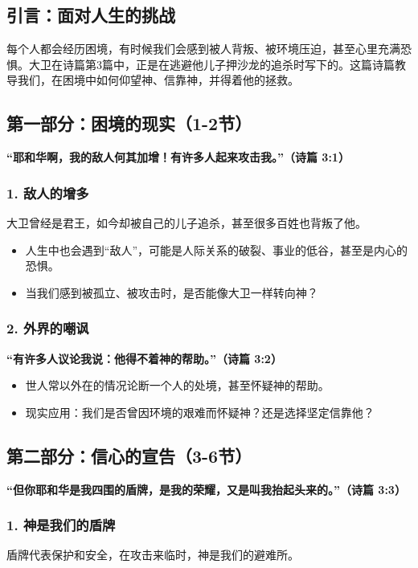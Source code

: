 \documentclass[a4paper, 12pt]{article}
\begin{document}
\subsection*{引言：面对人生的挑战}

每个人都会经历困境，有时候我们会感到被人背叛、被环境压迫，甚至心里充满恐惧。大卫在诗篇第3篇中，正是在逃避他儿子押沙龙的追杀时写下的。这篇诗篇教导我们，在困境中如何仰望神、信靠神，并得着他的拯救。

\subsection*{第一部分：困境的现实（1-2节）}

\textbf{“耶和华啊，我的敌人何其加增！有许多人起来攻击我。”（诗篇 3:1）}

\subsubsection*{1. 敌人的增多}
大卫曾经是君王，如今却被自己的儿子追杀，甚至很多百姓也背叛了他。
\begin{itemize}
    \item 人生中也会遇到“敌人”，可能是人际关系的破裂、事业的低谷，甚至是内心的恐惧。
    \item 当我们感到被孤立、被攻击时，是否能像大卫一样转向神？
\end{itemize}

\subsubsection*{2. 外界的嘲讽}
\textbf{“有许多人议论我说：他得不着神的帮助。”（诗篇 3:2）}

\begin{itemize}
    \item 世人常以外在的情况论断一个人的处境，甚至怀疑神的帮助。
    \item 现实应用：我们是否曾因环境的艰难而怀疑神？还是选择坚定信靠他？
\end{itemize}

\subsection*{第二部分：信心的宣告（3-6节）}

\textbf{“但你耶和华是我四围的盾牌，是我的荣耀，又是叫我抬起头来的。”（诗篇 3:3）}

\subsubsection*{1. 神是我们的盾牌}
盾牌代表保护和安全，在攻击来临时，神是我们的避难所。
\end{document}
